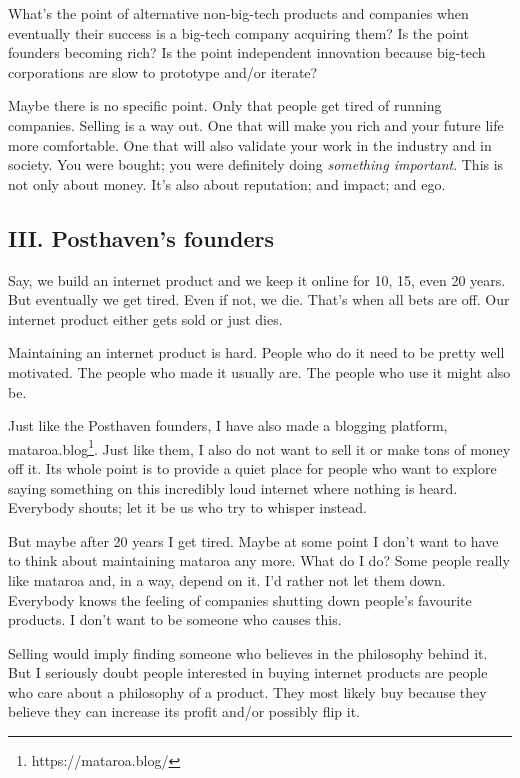 What’s the point of alternative non-big-tech products and companies when eventually their success is a big-tech company acquiring them? Is the point founders becoming rich? Is the point independent innovation because big-tech corporations are slow to prototype and/or iterate?

Maybe there is no specific point. Only that people get tired of running companies. Selling is a way out. One that will make you rich and your future life more comfortable. One that will also validate your work in the industry and in society. You were bought; you were definitely doing \emph{something important}. This is not only about money. It's also about reputation; and impact; and ego.

\subsection{III. Posthaven’s founders}

Say, we build an internet product and we keep it online for 10, 15, even 20 years. But eventually we get tired. Even if not, we die. That’s when all bets are off. Our internet product either gets sold or just dies.

Maintaining an internet product is hard. People who do it need to be pretty well motivated. The people who made it usually are. The people who use it might also be.

Just like the Posthaven founders, I have also made a blogging platform, mataroa.blog\footnote{https://mataroa.blog/}. Just like them, I also do not want to sell it or make tons of money off it. Its whole point is to provide a quiet place for people who want to explore saying something on this incredibly loud internet where nothing is heard. Everybody shouts; let it be us who try to whisper instead.

But maybe after 20 years I get tired. Maybe at some point I don’t want to have to think about maintaining mataroa any more. What do I do? Some people really like mataroa and, in a way, depend on it. I’d rather not let them down. Everybody knows the feeling of companies shutting down people’s favourite products. I don’t want to be someone who causes this.

Selling would imply finding someone who believes in the philosophy behind it. But I seriously doubt people interested in buying internet products are people who care about a philosophy of a product. They most likely buy because they believe they can increase its profit and/or possibly flip it.

